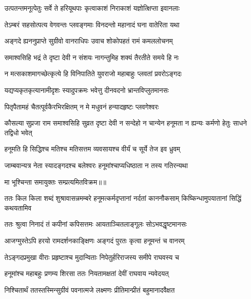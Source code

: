 \twolineshloka
{उत्पतन्तमनूत्पेतुः सर्वे ते हरियूथपाः}
{कृत्वाकाशं निराकाशं यज्ञोत्क्षिप्ता इवानलाः} %

\twolineshloka
{तेऽम्बरं सहसोत्पत्य वेगवन्तः प्लवङ्गमाः}
{विनदन्तो महानादं घना वातेरिता यथा} %

\twolineshloka
{अङ्गदे ह्यननुप्राप्ते सुग्रीवो वानराधिपः}
{उवाच शोकोपहतं रामं कमललोचनम्} %

\twolineshloka
{समाश्वसिहि भद्रं ते दृष्टा देवी न संशयः}
{नागन्तुमिह शक्यं तैरतीते समये हि नः} %

\twolineshloka
{न मत्सकाशमागच्छेत्कृत्ये हि विनिपातिते}
{युवराजो महाबाहुः प्लवतां प्रवरोऽङ्गदः} %

\twolineshloka
{यद्यप्यकृतकृत्यानामीदृशः स्यादुपक्रमः}
{भवेत्तु दीनवदनो भ्रान्तविप्लुतमानसः} %

\twolineshloka
{पितृपैतामहं चैतत्पूर्वकैरभिरक्षितम्}
{न मे मधुवनं हन्यादहृष्टः प्लवगेश्वरः} %

\threelineshloka
{कौसल्या सुप्रजा राम समाश्वसिहि सुव्रत}
{दृष्टा देवी न सन्देहो न चान्येन हनूमता}
{न ह्यन्यः कर्मणो हेतुः साधने तद्विधो भवेत्} %

\twolineshloka
{हनूमति हि सिद्धिश्च मतिश्च मतिसत्तम}
{व्यवसायश्च वीर्यं च सूर्ये तेज इव ध्रुवम्} %

\twolineshloka
{जाम्बवान्यत्र नेता स्यादङ्गदश्च बलेश्वरः}
{हनूमांश्चाप्यधिष्ठाता न तस्य गतिरन्यथा} %

{मा भूश्चिन्ता समायुक्तः सम्प्रत्यमितविक्रम॥॥} %

\addtocounter{shlokacount}{1}

\threelineshloka
{ततः किल किला शब्दं शुश्रावासन्नमम्बरे}
{हनूमत्कर्मदृप्तानां नर्दतां काननौकसाम्}
{किष्किन्धामुपयातानां सिद्धिं कथयतामिव} %

\twolineshloka
{ततः श्रुत्वा निनादं तं कपीनां कपिसत्तमः}
{आयताञ्चितलाङ्गूलः सोऽभवद्धृष्टमानसः} %

\twolineshloka
{आजग्मुस्तेऽपि हरयो रामदर्शनकाङ्क्षिणः}
{अङ्गदं पुरतः कृत्वा हनूमन्तं च वानरम्} %

\twolineshloka
{तेऽङ्गदप्रमुखा वीराः प्रहृष्टाश्च मुदान्विताः}
{निपेतुर्हरिराजस्य समीपे राघवस्य च} %

\twolineshloka
{हनूमांश्च महाबहुः प्रणम्य शिरसा ततः}
{नियतामक्षतां देवीं राघवाय न्यवेदयत्} %

\twolineshloka
{निश्चितार्थं ततस्तस्मिन्सुग्रीवं पवनात्मजे}
{लक्ष्मणः प्रीतिमान्प्रीतं बहुमानादवैक्षत} %

